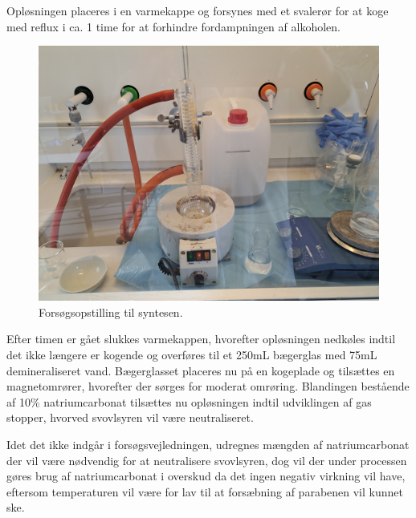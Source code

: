     Opløsningen placeres i en varmekappe og forsynes med et svalerør for at koge med reflux i ca. 1 time for at forhindre fordampningen af alkoholen.
    \begin{figure}[H]
        \includegraphics[width=\textwidth]{billeder/opstilling}
        \caption{Forsøgsopstilling til syntesen.}
    \end{figure}
    Efter timen er gået slukkes varmekappen, hvorefter opløsningen nedkøles indtil det ikke længere er kogende og overføres til et 250mL bægerglas med 75mL demineraliseret vand. Bægerglasset placeres nu på en kogeplade og tilsættes en magnetomrører, hvorefter der sørges for moderat omrøring. Blandingen bestående af 10\% natriumcarbonat tilsættes nu opløsningen indtil udviklingen af gas stopper, hvorved svovlsyren vil være neutraliseret.

    Idet det ikke indgår i forsøgsvejledningen, udregnes mængden af natriumcarbonat der vil være nødvendig for at neutralisere svovlsyren, dog vil der under processen gøres brug af natriumcarbonat i overskud da det ingen negativ virkning vil have, eftersom temperaturen vil være for lav til at forsæbning af parabenen vil kunnet ske.

